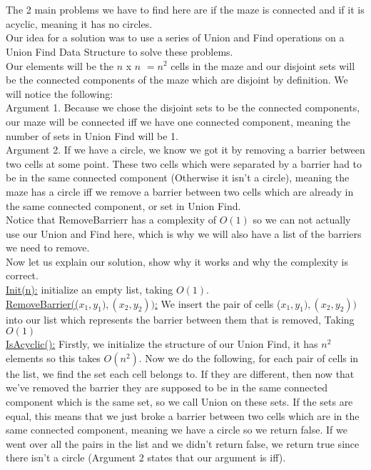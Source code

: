 \documentclass{article}
\begin{document}
\section{}
The 2 main problems we have to find here are if the maze is connected and if it is acyclic, meaning it has no circles.
\\Our idea for a solution was to use a series of Union and Find operations on a Union Find Data Structure to solve these problems.\\
Our elements will be the $n$ x $n$ $= n^2$ cells in the maze and our disjoint sets will be the connected components of the maze which are disjoint by definition.  We will notice the following:\\
Argument 1. Because we chose the disjoint sets to be the connected components, our maze will be connected iff we have one connected component, meaning the number of sets in Union Find will be 1.\\
Argument 2. If we have a circle, we know we got it by removing a barrier between two cells at some point. These two cells which were separated by a barrier had to be in the same connected component (Otherwise it isn't a circle), meaning the maze has a circle iff we remove a barrier between two cells which are already in the same connected component, or set in Union Find.\\
Notice that RemoveBarrierr has a complexity of $O(1)$ so we can not actually use our Union and Find here, which is why we will also have a list of the barriers we need to remove.\\
Now let us explain our solution, show why it works and why the complexity is correct.\\
\underline{Init(n):} initialize an empty list, taking $O(1)$.\\
\underline{RemoveBarrier(($x_1,y_1),(x_2,y_2))$:} We insert the pair of cells ($x_1,y_1),(x_2,y_2))$ into our list which represents the barrier between them that is removed, Taking $O(1)$\\
\underline{IsAcyclic():} Firstly, we initialize the structure of our Union Find, it has $n^2$ elements so this takes $O(n^2)$. Now we do the following, for each pair of cells in the list, we find the set each cell belongs to. If they are different, then now that we've removed the barrier they are supposed to be in the same connected component which is the same set, so we call Union on these sets. If the sets are equal, this means that we just broke a barrier between two cells which are in the same connected component, meaning we have a circle so we return false. If we went over all the pairs in the list and we didn't return false, we return true since there isn't a circle (Argument 2 states that our argument is iff).\\
\end{document}
